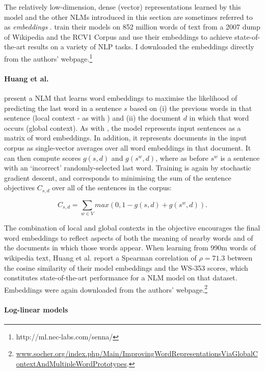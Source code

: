 The relatively low-dimension, dense (vector) representations learned by this model and the other NLMs introduced in this section are sometimes referred to as \emph{embeddings} \cite{turian2010word}. \cite{collobert2008unified} train their models on 852 million words of text from a 2007 dump of Wikipedia and the RCV1 Corpus \cite{lewis2004rcv1} and use their embeddings to achieve state-of-the-art results on a variety of NLP tasks. I downloaded the embeddings directly from the authors' webpage.\footnote{http://ml.nec-labs.com/senna/}

 \paragraph{\bf Huang et al.}

\cite{huang2012improving} present a NLM that learns word embeddings to maximise the likelihood of predicting the last word in a sentence \(s\) based on (i) the previous words in that sentence (local context - as with \cite{collobert2008unified}) and (ii) the document \( d\) in which that word occurs (global context). As with \cite{collobert2008unified}, the model represents input sentences as a matrix of word embeddings. In addition, it represents documents in the input corpus as single-vector averages over all word embeddings in that document. It can then compute scores \(g(s,d )\) and \(g(s^w, d) \), where as before \(s^w\) is a sentence with an `incorrect' randomly-selected last word. Training is again by stochastic gradient descent, and corresponds to minimising the sum of the sentence objectives \(C_{s,d} \) over all of the sentences in the corpus:

\[ C_{s,d}  = \sum_{w \in V} max(0,1-g(s,d) + g(s^w,d)). \]

The combination of local and global contexts in the objective encourages the final word embeddings to reflect aspects of both the meaning of nearby words and of the documents in which those words appear. When learning from 990m words of wikipedia text, Huang et al. report a Spearman correlation of \(\rho = 71.3\) between the cosine similarity of their model embeddings and the WS-353 scores, which constitutes state-of-the-art performance for a NLM model on that dataset. Embeddings were again downloaded from the authors' webpage.\footnote{\url{www.socher.org/index.php/Main/ImprovingWordRepresentationsViaGlobalContextAndMultipleWordPrototypes}.}

\paragraph{\bf Log-linear models}

